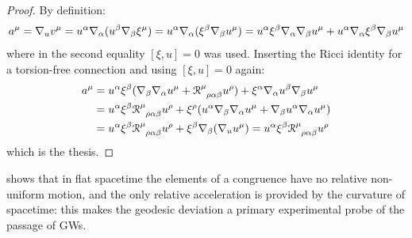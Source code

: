 \begin{proofbox}
  \begin{proof}
    By definition:
    \begin{equation*}
      a^\mu = \nabla_u v^\mu = u^\alpha \nabla_\alpha (u^\beta \nabla_\beta \xi^\mu) = u^\alpha \nabla_\alpha (\xi^\beta \nabla_\beta u^\mu) = u^\alpha \xi^\beta \nabla_\alpha \nabla_\beta u^\mu + u^\alpha \nabla_\alpha \xi^\beta \nabla_\beta u^\mu
    \end{equation*}
    where in the second equality $ [\xi , u] = 0 $ was used. Inserting the Ricci identity  for a torsion-free connection and using $ [\xi , u] = 0 $ again:
    \begin{equation*}
      \begin{split}
        a^\mu
        & = u^\alpha \xi^\beta (\na_\beta \na_\alpha u^\mu + \tensor{\rr}{^\mu_{\rho \alpha \beta}} u^\rho) + \xi^\alpha \na_\alpha u^\beta \na_\beta u^\mu \\
        & = u^\alpha \xi^\beta \tensor{\rr}{^\mu_{\rho \alpha \beta}} u^\rho + \xi^\rho (u^\alpha \na_\beta \na_\alpha u^\mu + \na_\beta u^\alpha \na_\alpha u^\mu) \\
        & = u^\alpha \xi^\beta \tensor{\rr}{^\mu_{\rho \alpha \beta}} u^\rho + \xi^\beta \na_\beta (\na_u u^\mu) = u^\alpha \xi^\beta \tensor{\rr}{^\mu_{\rho \alpha \beta}} u^\rho
      \end{split}
    \end{equation*}
    which is the thesis.
  \end{proof}
\end{proofbox}

 shows that in flat spacetime the elements of a congruence have no relative non-uniform motion, and the only relative acceleration is provided by the curvature of spacetime: this makes the geodesic deviation a primary experimental probe of the passage of GWs.

